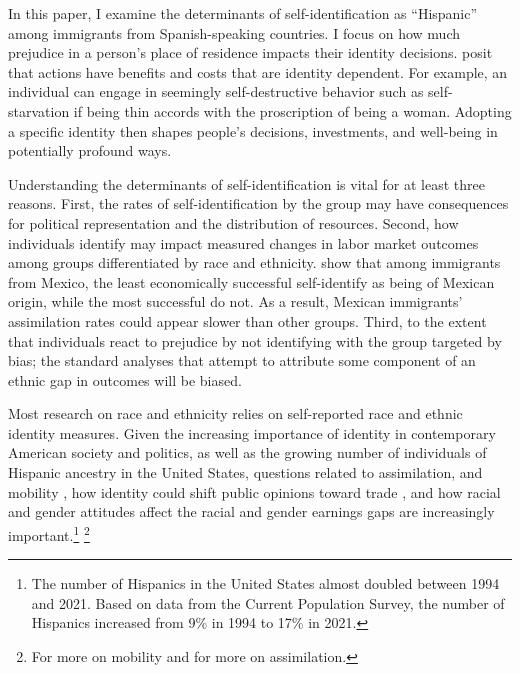 \documentclass[12pt, fullpage]{article}
\begin{document}
In this paper, I examine the determinants of self-identification as ``Hispanic'' among immigrants from Spanish-speaking countries. I focus on how much prejudice in a person's place of residence impacts their identity decisions.  \citet{akerlofEconomicsIdentity2000} posit that actions have benefits and costs that are identity dependent. For example, an individual can engage in seemingly self-destructive behavior such as self-starvation if being thin accords with the proscription of being a woman. Adopting a specific identity then shapes people's decisions, investments, and well-being in potentially profound ways. 

Understanding the determinants of self-identification is vital for at least three reasons. First, the rates of self-identification by the group may have consequences for political representation and the distribution of resources. Second, how individuals identify may impact measured changes in labor market outcomes among groups differentiated by race and ethnicity.  \citet{antmanEthnicAttritionObserved2016} show that among immigrants from Mexico, the least economically successful self-identify as being of Mexican origin, while the most successful do not. As a result, Mexican immigrants' assimilation rates could appear slower than other groups. Third, to the extent that individuals react to prejudice by not identifying with the group targeted by bias; the standard analyses that attempt to attribute some component of an ethnic gap in outcomes will be biased.

Most research on race and ethnicity relies on self-reported race and ethnic identity measures. Given the increasing importance of identity in contemporary American society and politics, as well as the growing number of individuals of Hispanic ancestry in the United States, questions related to assimilation, and mobility \citep{chettyUnitedStatesStill2014,abramitzkyNationImmigrantsAssimilation2014}, how identity could shift public opinions toward trade \citep{grossmanIdentityPoliticsTrade2021}, and how racial and gender attitudes affect the racial and gender earnings gaps \citep{charlesPrejudiceWagesEmpirical2008,charlesEffectsSexismAmerican2018} are increasingly important.\footnote{The number of Hispanics in the United States almost doubled between 1994 and 2021. Based on data from the Current Population Survey, the number of Hispanics increased from 9\% in 1994 to 17\% in 2021.} \footnote{For more on mobility\citet{chettyEffectsExposureBetter2016,chettyFadingAmericanDream2017,chettyWhereLandOpportunity2014} and \citet{abramitzkyImmigrantsAssimilateMore2020a,abramitzkyCulturalAssimilationAge2016,chettyWhereLandOpportunity2014} for more on assimilation.}
\end{document}
